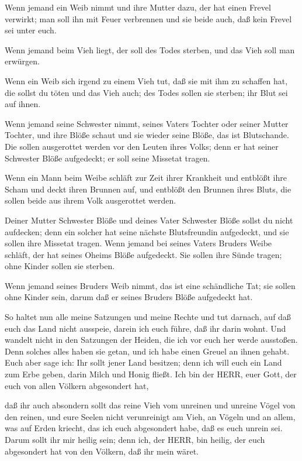  Wenn jemand ein Weib nimmt und ihre Mutter dazu, der hat
einen Frevel verwirkt; man soll ihn mit Feuer verbrennen und sie beide
auch, daß kein Frevel sei unter euch.

 Wenn jemand beim Vieh liegt, der soll des Todes sterben,
und das Vieh soll man erwürgen.

 Wenn ein Weib sich irgend zu einem Vieh tut, daß sie mit
ihm zu schaffen hat, die sollst du töten und das Vieh auch; des Todes
sollen sie sterben; ihr Blut sei auf ihnen.

 Wenn jemand seine Schwester nimmt, seines Vaters Tochter
oder seiner Mutter Tochter, und ihre Blöße schaut und sie wieder seine
Blöße, das ist Blutschande. Die sollen ausgerottet werden vor den Leuten
ihres Volks; denn er hat seiner Schwester Blöße aufgedeckt; er soll
seine Missetat tragen.

 Wenn ein Mann beim Weibe schläft zur Zeit ihrer Krankheit
und entblößt ihre Scham und deckt ihren Brunnen auf, und entblößt den
Brunnen ihres Bluts, die sollen beide aus ihrem Volk ausgerottet werden.

 Deiner Mutter Schwester Blöße und deines Vater Schwester
Blöße sollst du nicht aufdecken; denn ein solcher hat seine nächste
Blutsfreundin aufgedeckt, und sie sollen ihre Missetat tragen.
 Wenn jemand bei seines Vaters Bruders Weibe schläft, der
hat seines Oheims Blöße aufgedeckt. Sie sollen ihre Sünde tragen; ohne
Kinder sollen sie sterben.

 Wenn jemand seines Bruders Weib nimmt, das ist eine
schändliche Tat; sie sollen ohne Kinder sein, darum daß er seines
Bruders Blöße aufgedeckt hat.

 So haltet nun alle meine Satzungen und meine Rechte und
tut darnach, auf daß euch das Land nicht ausspeie, darein ich euch
führe, daß ihr darin wohnt.  Und wandelt nicht in den
Satzungen der Heiden, die ich vor euch her werde ausstoßen. Denn solches
alles haben sie getan, und ich habe einen Greuel an ihnen gehabt.
 Euch aber sage ich: Ihr sollt jener Land besitzen; denn
ich will euch ein Land zum Erbe geben, darin Milch und Honig fließt. Ich
bin der HERR, euer Gott, der euch von allen Völkern abgesondert hat,

 daß ihr auch absondern sollt das reine Vieh vom unreinen
und unreine Vögel von den reinen, und eure Seelen nicht verunreinigt am
Vieh, an Vögeln und an allem, was auf Erden kriecht, das ich euch
abgesondert habe, daß es euch unrein sei.  Darum sollt ihr
mir heilig sein; denn ich, der HERR, bin heilig, der euch abgesondert
hat von den Völkern, daß ihr mein wäret.


